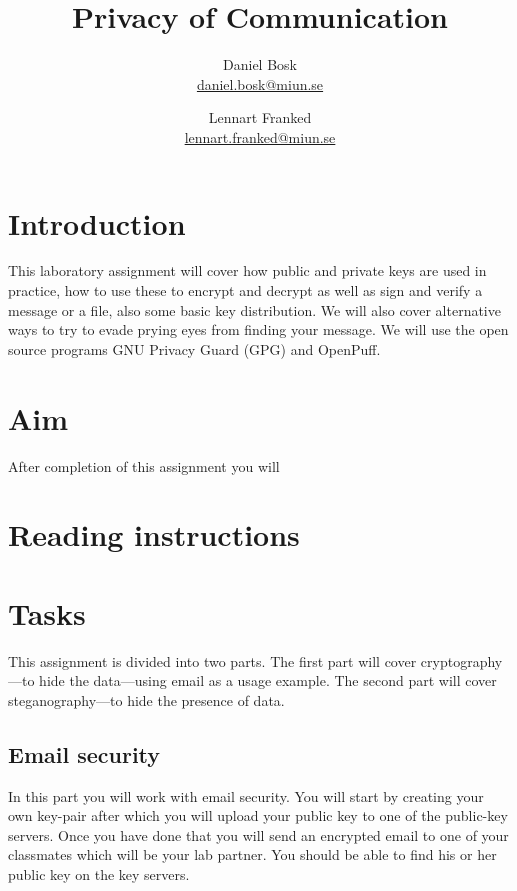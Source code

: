\documentclass[a4paper,nocourse]{miunasgn}
\title{Privacy of Communication}
\author{Daniel Bosk\\
  {\small\href{mailto:daniel.bosk@miun.se}{daniel.bosk@miun.se}}
  \and
  Lennart Franked\\
  {\small\href{mailto:daniel.bosk@miun.se}{lennart.franked@miun.se}}
}
\date{\svnId}
\begin{document}
\maketitle
\thispagestyle{foot}
\tableofcontents

\section{Introduction}
\label{sec:Introduction}
This laboratory assignment will cover how public and private keys are used in 
practice, how to use these to encrypt and decrypt as well as sign and verify 
a message or a file, also some basic key distribution.
We will also cover alternative ways to try to evade prying eyes from finding
your message.
We will use the open source programs GNU Privacy Guard (GPG) and OpenPuff.


\section{Aim}
\label{sec:Aim}
After completion of this assignment you will
\begin{itemize}
    
\end{itemize}


\section{Reading instructions}
\label{sec:Reading}



\section{Tasks}
\label{sec:Tasks}
This assignment is divided into two parts.
The first part will cover cryptography---to hide the data---using email as 
a usage example.
The second part will cover steganography---to hide the presence of data.

\subsection{Email security}
\label{subsec:Email}
In this part you will work with email security.
You will start by creating your own key-pair after which you will upload your 
public key to one of the public-key servers.
Once you have done that you will send an encrypted email to one of your
classmates which will be your lab partner.
You should be able to find his or her public key on the key servers.
\end{document}

